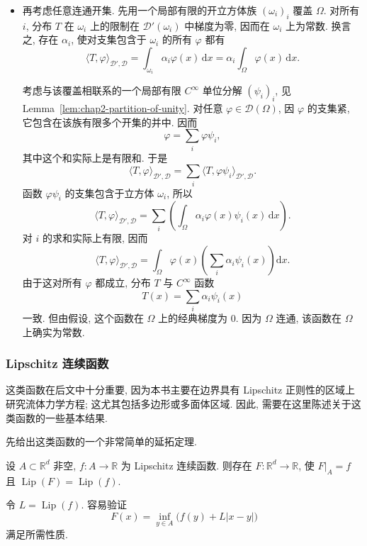 \begin{Proof}
\begin{itemize}
\item 再考虑任意连通开集. 先用一个局部有限的开立方体族 $(\omega_i)_i$ 覆盖 $\Omega$. 对所有 $i$, 分布 $T$ 在 $\omega_i$ 上的限制在 $\mathcal{D}'(\omega_i)$ 中梯度为零, 因而在 $\omega_i$ 上为常数. 换言之, 存在 $\alpha_i$, 使对支集包含于 $\omega_i$ 的所有 $\varphi$ 都有
\[
  \langle T,\varphi\rangle_{\mathcal{D}',\mathcal{D}}
  =\int_{\omega_i}\alpha_i\varphi(x)\,\mathrm{d}x
  =\alpha_i\int_\Omega\varphi(x)\,\mathrm{d}x.
\]

考虑与该覆盖相联系的一个局部有限 $C^\infty$ 单位分解 $(\psi_i)_i$, 见 Lemma~\ref{lem:chap2-partition-of-unity}. 对任意 $\varphi\in\mathcal{D}(\Omega)$, 因 $\varphi$ 的支集紧, 它包含在该族有限多个开集的并中. 因而
\[
  \varphi=\sum_i\varphi\psi_i,
\]
其中这个和实际上是有限和. 于是
\[
  \langle T,\varphi\rangle_{\mathcal{D}',\mathcal{D}}
  =\sum_i\langle T,\varphi\psi_i\rangle_{\mathcal{D}',\mathcal{D}}.
\]
函数 $\varphi\psi_i$ 的支集包含于立方体 $\omega_i$, 所以
\[
  \langle T,\varphi\rangle_{\mathcal{D}',\mathcal{D}}
  =\sum_i\left(\int_\Omega\alpha_i\varphi(x)\psi_i(x)\,\mathrm{d}x\right).
\]
对 $i$ 的求和实际上有限, 因而
\[
  \langle T,\varphi\rangle_{\mathcal{D}',\mathcal{D}}
  =\int_\Omega\varphi(x)\left(\sum_i\alpha_i\psi_i(x)\right)\mathrm{d}x.
\]
由于这对所有 $\varphi$ 都成立, 分布 $T$ 与 $C^\infty$ 函数
\[
  T(x)=\sum_i\alpha_i\psi_i(x)
\]
一致. 但由假设, 这个函数在 $\Omega$ 上的经典梯度为 $0$. 因为 $\Omega$ 连通, 该函数在 $\Omega$ 上确实为常数.
\end{itemize}
\end{Proof}

\subsubsection{Lipschitz 连续函数}
\label{subsec:chap2-lipschitz-functions}

这类函数在后文中十分重要, 因为本书主要在边界具有 Lipschitz 正则性的区域上研究流体力学方程; 这尤其包括多边形或多面体区域. 因此, 需要在这里陈述关于这类函数的一些基本结果.

先给出这类函数的一个非常简单的延拓定理.

\begin{Proposition}
\label{prop:chap2-mcshane-whitney-extension}
设 $A\subset\mathbb{R}^d$ 非空, $f:A\to\mathbb{R}$ 为 Lipschitz 连续函数. 则存在 $F:\mathbb{R}^d\to\mathbb{R}$, 使 $F|_A=f$ 且 $\operatorname{Lip}(F)=\operatorname{Lip}(f)$.
\end{Proposition}

\begin{Proof}
令 $L=\operatorname{Lip}(f)$. 容易验证
\[
  F(x)=\inf_{y\in A}\bigl(f(y)+L|x-y|\bigr)
\]
满足所需性质.
\end{Proof}

